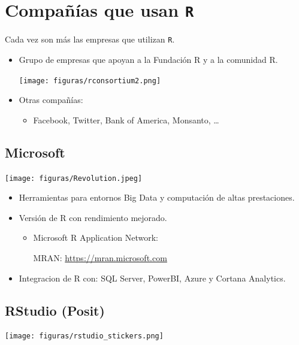 \documentclass[
]{book}
\providecommand{\tightlist}{%
  \setlength{\itemsep}{0pt}\setlength{\parskip}{0pt}}
\theoremstyle{break}
\theoremstyle{nonumberplain}
\begin{document}
\hypertarget{compauxf1uxedas-que-usan-r}{%
\chapter{\texorpdfstring{Compañías que usan \texttt{R}}{Compañías que usan R}}\label{compauxf1uxedas-que-usan-r}}

Cada vez son más las empresas que utilizan \texttt{R}.

\begin{itemize}
\item
  Grupo de empresas que apoyan a la Fundación R y a la comunidad R.

  \texttt{[image: figuras/rconsortium2.png]}
\item
  Otras compañías:

  \begin{itemize}
  \tightlist
  \item
    Facebook, Twitter, Bank of America, Monsanto, \ldots{}
  \end{itemize}
\end{itemize}

\hypertarget{microsoft}{%
\section{Microsoft}\label{microsoft}}

\texttt{[image: figuras/Revolution.jpeg]}

\begin{itemize}
\item
  Herramientas para entornos Big Data y computación de altas prestaciones.
\item
  Versión de R con rendimiento mejorado.

  \begin{itemize}
  \item
    Microsoft R Application Network:

    MRAN: \url{https://mran.microsoft.com}
  \end{itemize}
\item
  Integracion de R con: SQL Server, PowerBI, Azure y Cortana
  Analytics.
\end{itemize}

\hypertarget{rstudio-com}{%
\section{RStudio (Posit)}\label{rstudio-com}}

\texttt{[image: figuras/rstudio\_stickers.png]}
\end{document}
